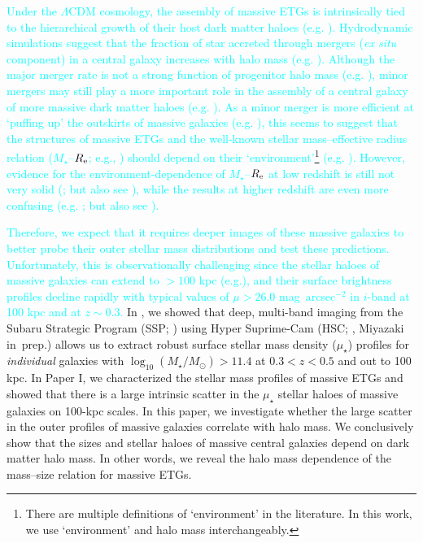 \documentclass[a4paper,fleqn,usenatbib]{mnras}
\def\sb{mag~arcsec$^{-2}$}
\def\mstar{{$M_{\star}$}}
\def\logms{{$\log_{10} (M_{\star}/M_{\odot})$}}
\def\mden{{$\mu_{\star}$}}
\newcommand{\song}[1]{\textcolor{cyan}{#1}}
\begin{document}
    \song{
    Under the $\Lambda$CDM cosmology, the assembly of massive ETGs is intrinsically 
    tied to the hierarchical growth of their host dark matter haloes 
    (e.g. \citealt{Leauthaud2012, Behroozi2013, Shankar2013}). 
    Hydrodynamic simulations suggest that the fraction of star accreted through 
    mergers (\textit{ex situ} component) in a central galaxy increases with halo 
    mass (e.g. \citealt{Pillepich2017b}). 
    Although the major merger rate is not a strong function of progenitor halo mass 
    (e.g. \citealt{Shankar2015}), minor mergers may still play a more important 
    role in the assembly of a central galaxy of more massive dark matter haloes 
    (e.g. \citealt{Guo2011, Yoon2017}). 
    As a minor merger is more efficient at `puffing up' the outskirts of massive 
    galaxies (e.g. \citealt{Oogi2013, Bedorf2013}), this seems to suggest that the 
    structures of massive ETGs and the well-known stellar mass--effective radius 
    relation (\mstar{}--$R_{\rm e}$; e.g., \citealt{Shen2003, Guo2009}) should depend 
    on their `environment'\footnote{There are multiple definitions of 
    `environment' in the literature.  
    In this work, we use `environment' and halo mass interchangeably.}
    (e.g. \citealt{Shankar2013, Shankar2014}). 
    However, evidence for the environment-dependence of \mstar{}--$R_{\rm e}$
    at low redshift is still not very solid (\citealt{Nair2010, HCompany13}; 
    but also see \citealt{Yoon2017}), while the results at higher redshift are 
    even more confusing (e.g. \citealt{Papovich2012, Lani2013, Delaye2014}; but 
    also see \citealt{Rettura2010}).
    }
	
	\song{
    Therefore, we expect that it requires deeper images of these massive galaxies to 
    better probe their outer stellar mass distributions and test these 
    predictions. 
    Unfortunately, this is observationally challenging since the stellar haloes 
    of massive galaxies can extend to $>100$ kpc (e.g.\citealt{Tal2011, DSouza2014}),
    and their surface brightness profiles decline rapidly with typical values of 
    $\mu > 26.0$ \sb{} in $i$-band at 100 kpc and at $z\sim0.3$. 
    }
    In \citet[][Paper I hereafter]{hscMassiveI}, we showed that deep, 
    multi-band imaging from the Subaru Strategic Program (SSP; \citealt{HSC-SSP,
    HSC-DR1}) using Hyper Suprime-Cam (HSC; \citealt{Miyazaki2012}, 
    Miyazaki in~prep.) allows us to extract robust surface stellar
    mass density (\mden{}) profiles for {\it individual} galaxies with 
    \logms{}$>11.4$ at $0.3 < z < 0.5$ and out to 100 kpc. 
    In Paper I, we characterized the stellar mass profiles of massive ETGs and 
    showed that there is a large intrinsic scatter in the \mden{} stellar haloes of
    massive galaxies on 100-kpc scales. 
    In this paper, we investigate whether the large scatter in the outer 
    profiles of massive galaxies correlate with halo mass. 
    We conclusively show that the sizes and stellar haloes of massive central galaxies 
    depend on dark matter halo mass. 
    In other words, we reveal the halo mass dependence of the mass--size relation 
    for massive ETGs.   
    
\end{document}
